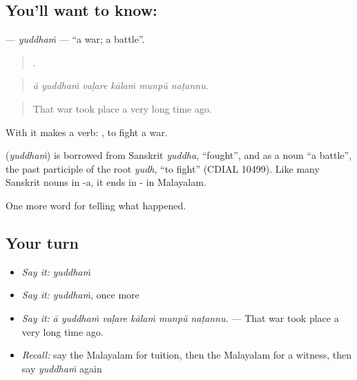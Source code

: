 \subsection*{You'll want to know: }
\textbf{} — \emph{yuddhaṁ} — \textquotedblleft{}a war; a battle\textquotedblright{}.

\begin{quote}
     .
\end{quote}

\begin{quote}
\emph{ā yuddhaṁ vaḷare kālaṁ munpŭ naṭannu.}
\end{quote}

\begin{quote}
That war took place a very long time ago.
\end{quote}

With  it makes a verb:  , to fight a war.

\begin{cousinweb}
\textbf{} (\emph{yuddhaṁ}) is borrowed from Sanskrit \emph{yuddha}, \textquotedblleft{}fought\textquotedblright{}, and as a noun \textquotedblleft{}a battle\textquotedblright{}, the past participle of the root \emph{yudh}, \textquotedblleft{}to fight\textquotedblright{} (CDIAL 10499). Like many Sanskrit nouns in -a, it ends in - in Malayalam.
\end{cousinweb}

\begin{grammarlens}[title={What you've built}]
One more word for telling what happened.
\end{grammarlens}

\subsection*{Your turn}
\begin{itemize}
\raggedright
  \item \emph{Say it:} \emph{yuddhaṁ}
  \item \emph{Say it:} \emph{yuddhaṁ}, once more
  \item \emph{Say it:} \emph{ā yuddhaṁ vaḷare kālaṁ munpŭ naṭannu.} — That war took place a very long time ago.
  \item \emph{Recall:} say the Malayalam for tuition, then the Malayalam for a witness, then say \emph{yuddhaṁ} again
\end{itemize}


